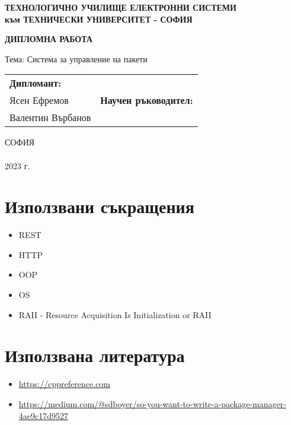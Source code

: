 \documentclass[14pt]{extreport}
\begin{document}
\begin{titlepage}
    \begin{center}
        \textbf{
            ТЕХНОЛОГИЧНО УЧИЛИЩЕ ЕЛЕКТРОННИ СИСТЕМИ \\
            към ТЕХНИЧЕСКИ УНИВЕРСИТЕТ - СОФИЯ
        }
    
        \vspace{5cm}
        \textbf{\huge ДИПЛОМНА РАБОТА}
    
        \vspace{20mm}
        {\Large Тема:
            Система за управление на пакети
        }
    
        \vspace{35mm}
        \begin{tabular}{p{8cm}p{8cm}}
            \centering
            \textbf{Дипломант:} \\
            Ясен Ефремов
            &
            \centering
            \textbf{Научен ръководител:} \\
            Валентин Върбанов
        \end{tabular}
    
        \vfill
        СОФИЯ \\
        \hfill \\
        2023 г.
    \end{center}
\end{titlepage}

\chapter*{Използвани съкращения}

\begin{itemize}
    \item REST
    \item HTTP
    \item OOP
    \item OS
    \item RAII - Resource Acquisition Is Initialization or RAII
\end{itemize}









\chapter*{Използвана литература}

\begin{itemize}
    \item \url{https://cppreference.com}
    \item \url{https://medium.com/@sdboyer/so-you-want-to-write-a-package-manager-4ae9c17d9527}
\end{itemize}


\tableofcontents
\end{document}
